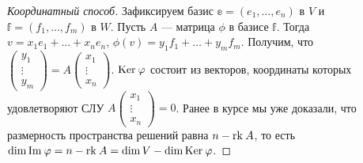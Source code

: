 \begin{proof}[Координатный способ]
    Зафиксируем базис $\mathbb{e} = (e_1, \ldots, e_n)$ в $V$ и $\mathbb{f} = (f_1, \ldots, f_m)$ в $W$. Пусть $A$ --- матрица $\phi$ в базисе $\mathbb{f}$. Тогда $v = x_1e_1 + \ldots + x_ne_n$, $\phi(v) = y_1f_1 + \ldots + y_mf_m$. Получим, что $\begin{pmatrix} y_1\\ \vdots \\ y_m \end{pmatrix} = A \begin{pmatrix} x_1\\ \vdots \\ x_n\end{pmatrix}$. $\mathrm{Ker}\: \varphi$ состоит из векторов, координаты которых удовлетворяют СЛУ $ A \begin{pmatrix} x_1\\ \vdots \\ x_n\end{pmatrix} = 0$. Ранее в курсе мы уже доказали, что размерность пространства решений равна $n - \mathrm{rk}\: A$, то есть $\dim \mathrm{Im\:} \varphi = n - \mathrm{rk}\: A = \dim V - \dim \mathrm{Ker}\: \varphi$.
\end{proof}
